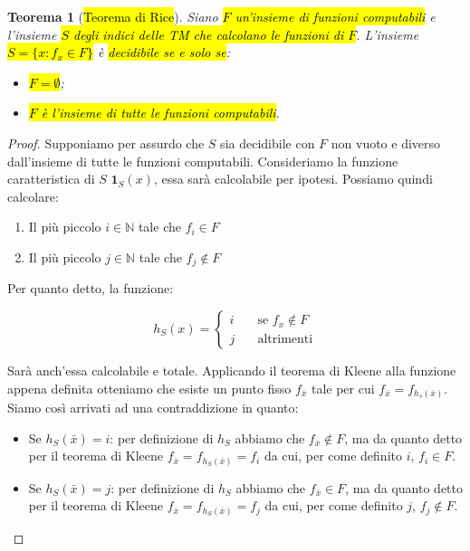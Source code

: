 \documentclass[a4paper,11pt,oneside]{article}
\theoremstyle{plain}
\newtheorem{thm}{Teorema}[section]
\theoremstyle{definition}
\theoremstyle{remark}
\begin{document}
\begin{thm}[\hl{Teorema di Rice}]\label{thm:rice}
  Siano \hl{$F$ un'insieme di funzioni computabili} e l'insieme \hl{$S$ degli
  indici delle TM che calcolano le funzioni di $F$}. L'insieme \hl{$S = \{x:f_x
  \in F\}$} è \hl{decidibile se e solo se}:

  \begin{itemize}
    \item \hl{$F = \emptyset$};
    \item \hl{$F$ è l'insieme di tutte le funzioni computabili}.
  \end{itemize}
\end{thm}
\begin{proof}
  Supponiamo per assurdo che $S$ sia decidibile con $F$ non vuoto e diverso
  dall'insieme di tutte le funzioni computabili. Consideriamo la funzione
  caratteristica di $S$ $\mathbf{1}_S(x)$, essa sarà calcolabile per ipotesi.
  Possiamo quindi calcolare:

  \begin{enumerate}
    \item Il più piccolo $i \in \mathbb{N}$ tale che $f_i \in F$
    \item Il più piccolo $j \in \mathbb{N}$ tale che $f_j \notin F$
  \end{enumerate}

  Per quanto detto, la funzione:

  \[
    h_S(x) =
    \begin{cases}
      i & \quad \text{se } f_x \notin F \\
      j & \quad \text{altrimenti}
    \end{cases}
  \]

  Sarà anch'essa calcolabile e totale. Applicando il teorema di Kleene alla
  funzione appena definita otteniamo che esiste un punto fisso $f_{\bar{x}}$ tale
  per cui $f_{\bar{x}} = f_{h_s(\bar{x})}$. Siamo così arrivati ad una
  contraddizione in quanto:

  \begin{itemize}
    \item Se $h_S(\bar{x}) = i$: per definizione di $h_S$ abbiamo che
      $f_{\bar{x}} \notin F$, ma da quanto detto per il teorema di Kleene
      $f_{\bar{x}} = f_{h_S(\bar{x})} = f_i$ da cui, per come definito $i$, $f_i
      \in F$.
    \item Se $h_S(\bar{x}) = j$: per definizione di $h_S$ abbiamo che
      $f_{\bar{x}} \in F$, ma da quanto detto per il teorema di Kleene
      $f_{\bar{x}} = f_{h_S(\bar{x})} = f_j$ da cui, per come definito $j$, $f_j
      \notin F$.
  \end{itemize}
\end{proof}
\end{document}
